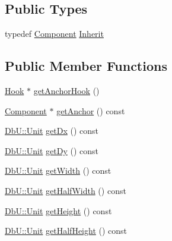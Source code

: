 \subsection*{Public Types}
\begin{DoxyCompactItemize}
\item 
typedef \mbox{\hyperlink{classHurricane_1_1Component}{Component}} \mbox{\hyperlink{classHurricane_1_1Contact_a422f15bba0561d8499c001fb8cbe6b67}{Inherit}}
\end{DoxyCompactItemize}
\subsection*{Public Member Functions}
\begin{DoxyCompactItemize}
\item 
\mbox{\hyperlink{classHurricane_1_1Hook}{Hook}} $\ast$ \mbox{\hyperlink{classHurricane_1_1Contact_a300306b006397377bc9a54ea783c1150}{get\+Anchor\+Hook}} ()
\item 
\mbox{\hyperlink{classHurricane_1_1Component}{Component}} $\ast$ \mbox{\hyperlink{classHurricane_1_1Contact_ab0b327b306bf7ebda634f59d8d0cfd8f}{get\+Anchor}} () const
\item 
\mbox{\hyperlink{group__DbUGroup_ga4fbfa3e8c89347af76c9628ea06c4146}{Db\+U\+::\+Unit}} \mbox{\hyperlink{classHurricane_1_1Contact_a8a5c4475668b6c6730ed5265e5447553}{get\+Dx}} () const
\item 
\mbox{\hyperlink{group__DbUGroup_ga4fbfa3e8c89347af76c9628ea06c4146}{Db\+U\+::\+Unit}} \mbox{\hyperlink{classHurricane_1_1Contact_af674c59fcaf1f5214d54a558fe30e41a}{get\+Dy}} () const
\item 
\mbox{\hyperlink{group__DbUGroup_ga4fbfa3e8c89347af76c9628ea06c4146}{Db\+U\+::\+Unit}} \mbox{\hyperlink{classHurricane_1_1Contact_a794ce7c3aa5ffe894c1231f7c5ac3c52}{get\+Width}} () const
\item 
\mbox{\hyperlink{group__DbUGroup_ga4fbfa3e8c89347af76c9628ea06c4146}{Db\+U\+::\+Unit}} \mbox{\hyperlink{classHurricane_1_1Contact_a4a5136f4e8299435e50db7da28172ca1}{get\+Half\+Width}} () const
\item 
\mbox{\hyperlink{group__DbUGroup_ga4fbfa3e8c89347af76c9628ea06c4146}{Db\+U\+::\+Unit}} \mbox{\hyperlink{classHurricane_1_1Contact_a07a4ecc7ea2479e2d63f5f31d9325dde}{get\+Height}} () const
\item 
\mbox{\hyperlink{group__DbUGroup_ga4fbfa3e8c89347af76c9628ea06c4146}{Db\+U\+::\+Unit}} \mbox{\hyperlink{classHurricane_1_1Contact_aebd3ff8e1368617ab750b20ae9ffb59b}{get\+Half\+Height}} () const

\end{DoxyCompactItemize}

